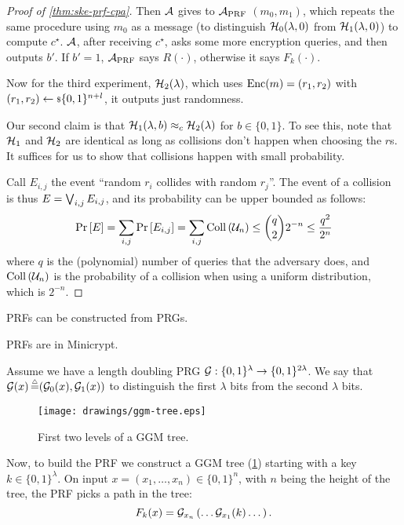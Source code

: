 \begin{proof}[Proof of \cref{thm:ske-prf-cpa}]
	Then $\mathcal{A}$ gives to $\mathcal{A}_{\text{PRF}}$ $(m_0, m_1)$, which repeats the same procedure using $m_0$ as a message (to distinguish $\mathcal{H}_0(\lambda, 0)$ from $\mathcal{H}_1(\lambda, 0)$) to compute $c^{\star}$.
	$\mathcal{A}$, after receiving $c^{\star}$, asks some more encryption queries, and then outputs $b'$.
	If $b' = 1$, $\mathcal{A}_{\text{PRF}}$ says $R(\cdot)$, otherwise it says $F_k(\cdot)$.

	Now for the third experiment, $\mathcal{H}_2(\lambda)$, which uses $\mathrm{Enc}(m) = (r_1, r_2)$ with $(r_1, r_2) \leftarrow {\scriptstyle \$} {\{0,1\}^{n+l}}$, \ie it outputs just randomness.

	Our second claim is that $\mathcal{H}_1(\lambda, b) \approx_c \mathcal{H}_2(\lambda)$ for $b \in \{0,1\}$.
	To see this, note that $\mathcal{H}_1$ and $\mathcal{H}_2$ are identical as long as collisions don't happen when choosing the $r$s.
	It suffices for us to show that collisions happen with small probability.

	Call $E_{i,j}$ the event ``random $r_i$ collides with random $r_j$''.
	The event of a collision is thus $E = \bigvee_{i,j} E_{i,j}$, and its probability can be upper bounded as follows:
	\begin{equation*}
		\mathop{\mathrm{Pr}}\limits_{} \left[ {E} \right] = \sum_{i,j} \mathop{\mathrm{Pr}}\limits_{} \left[ {E_{i,j}} \right] = \sum_{i,j} \mathrm{Coll}\left(\mathcal{U}_n\right) \le \binom{q}{2} 2^{-n} \le \frac{q^{2}}{2^{n}}
	\end{equation*}
	where $q$ is the (polynomial) number of queries that the adversary does, and $\mathrm{Coll}\left(\mathcal{U}_n\right)$ is the probability of a collision when using a uniform distribution, which is $2^{-n}$.
\end{proof} 

\begin{theorem}
	\acp{PRF} can be constructed from \acp{PRG}.
\end{theorem}

\begin{corollary}
	\acp{PRF} are in Minicrypt.
\end{corollary}

\begin{construction} \label{cons:ggm-tree}
	Assume we have a length doubling \ac{PRG} $\mathcal{G} : \{0,1\}^{\lambda} \to \{0,1\}^{2\lambda}$.
	We say that $\mathcal{G}(x) \mathop{=}\limits^{\scriptscriptstyle \triangle} (\mathcal{G}_0(x), \mathcal{G}_1(x))$ to distinguish the first $\lambda$ bits from the second $\lambda$ bits.

	\begin{figure}
		\centering
		\texttt{[image: drawings/ggm-tree.eps]}
		\caption{First two levels of a \acs{GGM} tree.}
		\label{fig:ggm-tree}
	\end{figure}

	Now, to build the \ac{PRF} we construct a \ac{GGM} tree (\cref{fig:ggm-tree}) starting with a key $k \in \{0,1\}^{\lambda}$.
	On input $x = (x_1, \dots, x_n) \in \{0,1\}^{n}$, with $n$ being the height of the tree, the \ac{PRF} picks a path in the tree:
	\begin{equation*}
		F_k(x) = \mathcal{G}_{x_n} \left( \dots \mathcal{G}_{x_1}(k) \dots \right).
	\end{equation*}
\end{construction}

